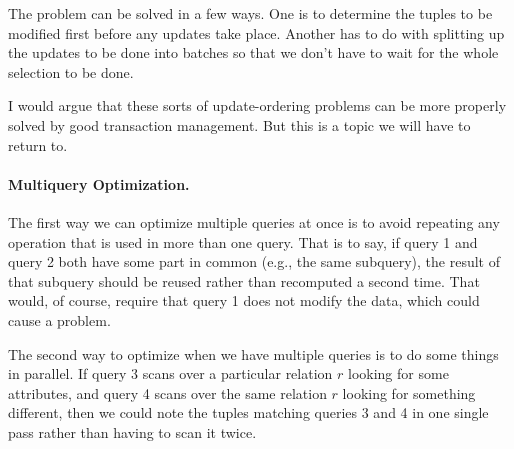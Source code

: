 The problem can be solved in a few ways. One is to determine the tuples to be modified first before any updates take place. Another has to do with splitting up the updates to be done into batches so that we don't have to wait for the whole selection to be done.

I would argue that these sorts of update-ordering problems can be more properly solved by good transaction management. But this is a topic we will have to return to.

\paragraph{Multiquery Optimization.}

The first way we can optimize multiple queries at once is to avoid repeating any operation that is used in more than one query. That is to say, if query 1 and query 2 both have some part in common (e.g., the same subquery), the result of that subquery should be reused rather than recomputed a second time. That would, of course, require that query 1 does not modify the data, which could cause a problem.

The second way to optimize when we have multiple queries is to do some things in parallel. If query 3 scans over a particular relation $r$ looking for some attributes, and query 4 scans over the same relation $r$ looking for something different, then we could note the tuples matching queries 3 and 4 in one single pass rather than having to scan it twice.




